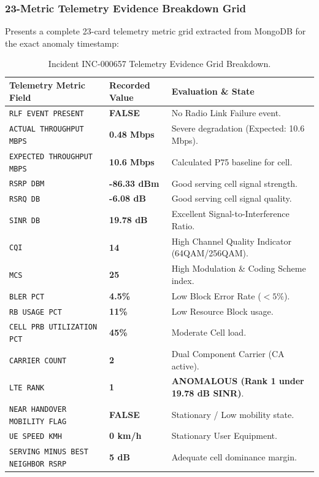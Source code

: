 \documentclass[12pt,a4paper]{article}
\begin{document}
\subsubsection{23-Metric Telemetry Evidence Breakdown Grid}
Presents a complete 23-card telemetry metric grid extracted from MongoDB for the exact anomaly timestamp:
\begin{table}[htbp]
\centering
\caption{Incident INC-000657 Telemetry Evidence Grid Breakdown.}
\label{tab:inc_657_grid_ug2}
\small
\begin{tabular}{lll}
\toprule
\textbf{Telemetry Metric Field} & \textbf{Recorded Value} & \textbf{Evaluation \& State} \\
\midrule
\texttt{RLF EVENT PRESENT} & \textbf{FALSE} & No Radio Link Failure event. \\
\texttt{ACTUAL THROUGHPUT MBPS} & \textbf{0.48 Mbps} & Severe degradation (Expected: 10.6 Mbps). \\
\texttt{EXPECTED THROUGHPUT MBPS} & \textbf{10.6 Mbps} & Calculated P75 baseline for cell. \\
\texttt{RSRP DBM} & \textbf{-86.33 dBm} & Good serving cell signal strength. \\
\texttt{RSRQ DB} & \textbf{-6.08 dB} & Good serving cell signal quality. \\
\texttt{SINR DB} & \textbf{19.78 dB} & Excellent Signal-to-Interference Ratio. \\
\texttt{CQI} & \textbf{14} & High Channel Quality Indicator (64QAM/256QAM). \\
\texttt{MCS} & \textbf{25} & High Modulation \& Coding Scheme index. \\
\texttt{BLER PCT} & \textbf{4.5\%} & Low Block Error Rate ($<5\%$). \\
\texttt{RB USAGE PCT} & \textbf{11\%} & Low Resource Block usage. \\
\texttt{CELL PRB UTILIZATION PCT} & \textbf{45\%} & Moderate Cell load. \\
\texttt{CARRIER COUNT} & \textbf{2} & Dual Component Carrier (CA active). \\
\texttt{LTE RANK} & \textbf{1} & \textbf{ANOMALOUS (Rank 1 under 19.78 dB SINR)}. \\
\texttt{NEAR HANDOVER MOBILITY FLAG} & \textbf{FALSE} & Stationary / Low mobility state. \\
\texttt{UE SPEED KMH} & \textbf{0 km/h} & Stationary User Equipment. \\
\texttt{SERVING MINUS BEST NEIGHBOR RSRP} & \textbf{5 dB} & Adequate cell dominance margin. \\

\end{tabular}
\end{table}
\end{document}

